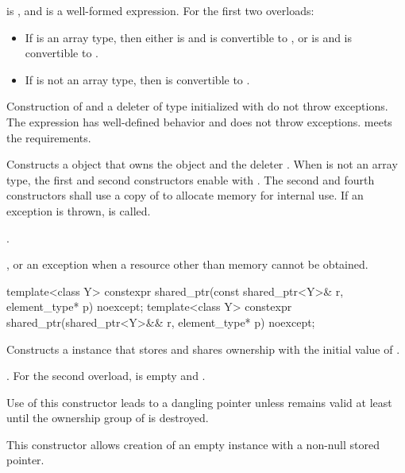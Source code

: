 \begin{itemdescr}
\pnum
\constraints
{} is , and
 is a well-formed expression.
For the first two overloads:

\begin{itemize}
\item
If  is an array type, then either
 is  and  is convertible to , or
 is  and  is convertible to .

\item
If  is not an array type, then  is convertible to .
\end{itemize}

\pnum
\expects
Construction of  and a deleter of type 
initialized with  do not throw exceptions.
The expression 
has well-defined behavior and does not throw exceptions.
 meets
the  requirements.

\pnum
\effects
Constructs a  object that owns the
object  and the deleter .
When  is not an array type,
the first and second constructors enable  with .
The second and fourth constructors shall use a copy of  to
allocate memory for internal use.
If an exception is thrown,  is called.

\pnum
\ensures
{}.

\pnum
\throws
{}, or an  exception
when a resource other than memory cannot be obtained.
\end{itemdescr}

%
\begin{itemdecl}
template<class Y> constexpr shared_ptr(const shared_ptr<Y>& r, element_type* p) noexcept;
template<class Y> constexpr shared_ptr(shared_ptr<Y>&& r, element_type* p) noexcept;
\end{itemdecl}

\begin{itemdescr}
\pnum
\effects
Constructs a  instance that
stores  and shares ownership with
the initial value of .

\pnum
\ensures
{}.
For the second overload,
 is empty and .

\pnum
\begin{note}
Use of this constructor leads to a dangling pointer
unless  remains valid
at least until the ownership group of  is destroyed.
\end{note}

\pnum
\begin{note}
This constructor allows creation of an empty
 instance with a non-null stored pointer.
\end{note}
\end{itemdescr}

